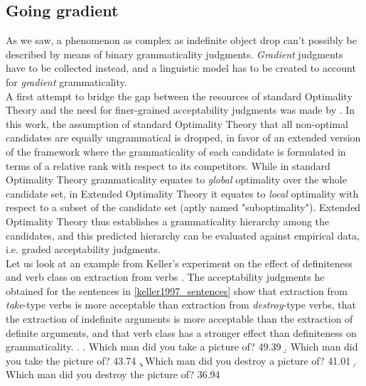 \subsection{Going gradient}  %
As we saw, a phenomenon as complex as indefinite object drop can't possibly be described by means of binary grammaticality judgments. \textit{Gradient} judgments have to be collected instead, and a linguistic model has to be created to account for \textit{gradient} grammaticality.\\
A first attempt to bridge the gap between the resources of standard Optimality Theory and the need for finer-grained acceptability judgments was made by \textcite{keller1997extraction}. In this work, the assumption of standard Optimality Theory that all non-optimal candidates are equally ungrammatical is dropped, in favor of an extended version of the framework where the grammaticality of each candidate is formulated in terms of a relative rank with respect to its competitors. While in standard Optimality Theory grammaticality equates to \textit{global} optimality over the whole candidate set, in Extended Optimality Theory it equates to \textit{local} optimality with respect to a subset of the candidate set (aptly named "suboptimality"). Extended Optimality Theory thus establishes a grammaticality hierarchy among the candidates, and this predicted hierarchy can be evaluated against empirical data, i.e. graded acceptability judgments.\\
Let us look at an example from Keller's experiment on the effect of definiteness and verb class on extraction from verbs \parencite[10-12]{keller1997extraction}. The acceptability judgments he obtained for the sentences in \ref{keller1997_sentences} show that extraction from \textit{take}-type verbs is more acceptable than extraction from \textit{destroy}-type verbs, that the extraction of indefinite arguments is more acceptable than the extraction of definite arguments, and that verb class has a stronger effect than definiteness on grammaticality.
\ex. \label{keller1997_sentences} \a. Which man did you take a picture of? \hfill 49.39
\b. Which man did you take the picture of? \hfill 43.74
\c. Which man did you destroy a picture of? \hfill 41.01
\d. Which man did you destroy the picture of? \hfill 36.94

